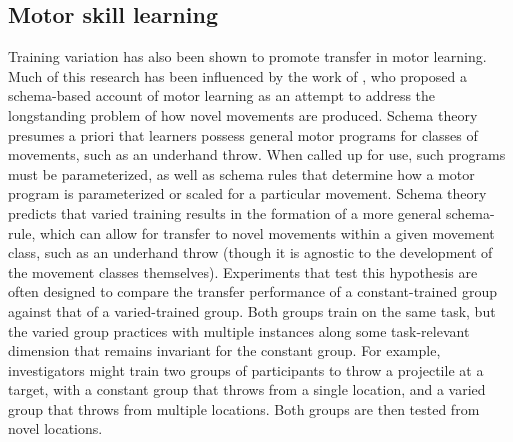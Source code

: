\documentclass[
  12pt,
  letterpaper,
]{article}
\begin{document}
\subsection{Motor skill learning}\label{motor-skill-learning}

Training variation has also been shown to promote transfer in motor
learning. Much of this research has been influenced by the work of
\autocite{schmidtSchemaTheoryDiscrete1975}, who proposed a schema-based
account of motor learning as an attempt to address the longstanding
problem of how novel movements are produced. Schema theory presumes a
priori that learners possess general motor programs for classes of
movements, such as an underhand throw. When called up for use, such
programs must be parameterized, as well as schema rules that determine
how a motor program is parameterized or scaled for a particular
movement. Schema theory predicts that varied training results in the
formation of a more general schema-rule, which can allow for transfer to
novel movements within a given movement class, such as an underhand
throw (though it is agnostic to the development of the movement classes
themselves). Experiments that test this hypothesis are often designed to
compare the transfer performance of a constant-trained group against
that of a varied-trained group. Both groups train on the same task, but
the varied group practices with multiple instances along some
task-relevant dimension that remains invariant for the constant group.
For example, investigators might train two groups of participants to
throw a projectile at a target, with a constant group that throws from a
single location, and a varied group that throws from multiple locations.
Both groups are then tested from novel locations.
\end{document}
